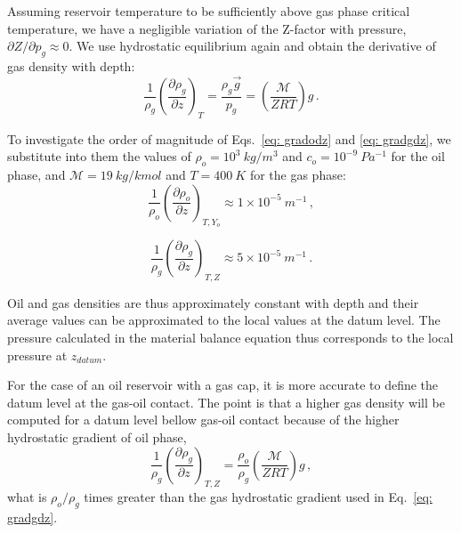\documentclass[final,authoryear,5p,twocolumn,10pt]{elsarticle}
\begin{document}
Assuming reservoir temperature to be sufficiently above gas phase critical temperature, we have a negligible variation of the Z-factor with pressure, $\partial Z / \partial p_g \approx 0$. We use hydrostatic equilibrium again and obtain the derivative of gas density with depth:
\begin{equation}\label{eq: gradgdz}
\frac{1}{\rho_g}\left(\frac{\partial \rho_g}{\partial z}\right)_{T} = \frac{\rho_g \vec{g}}{p_g} = \left(\frac{\mathcal{M}}{ Z R T}\right) g \, .
\end{equation}

To investigate the order of magnitude of Eqs.~\eqref{eq: gradodz} and \eqref{eq: gradgdz}, we substitute into them the values of $\rho_o = 10^3\ kg/m^3$ and $c_o = 10^{-9}\ Pa^{-1}$ for the oil phase, and $\mathcal{M}=19\ kg/kmol$ and $T=400\ K$ for the gas phase: 
\begin{equation}
\frac{1}{\rho_o}\left(\frac{\partial \rho_o}{\partial z}\right)_{T,Y_o} \approx 1\times10^{-5}\ m^{-1} \, ,
\end{equation}

\begin{equation}
\frac{1}{\rho_g}\left(\frac{\partial \rho_g}{\partial z}\right)_{T,Z} \approx 5\times10^{-5}\ m^{-1} \, .
\end{equation}

Oil and gas densities are thus approximately constant with depth and their average values can be approximated to the local values at the datum level. The pressure calculated in the material balance equation thus corresponds to the local pressure at $z_{datum}$.


For the case of an oil reservoir with a gas cap, it is more accurate to define the datum level at the gas-oil contact. The point is that a higher gas density will be computed for a datum level bellow gas-oil contact because of the higher hydrostatic gradient of oil phase,
\begin{equation}
\frac{1}{\rho_g}\left(\frac{\partial \rho_g}{\partial z}\right)_{T,Z} = \frac{\rho_o}{\rho_g}\left(\frac{\mathcal{M}}{Z R T}\right)g  \, ,
\end{equation}
what is $\rho_o / \rho_g$ times greater than the gas hydrostatic gradient used in Eq.~\eqref{eq: gradgdz}.
\end{document}
